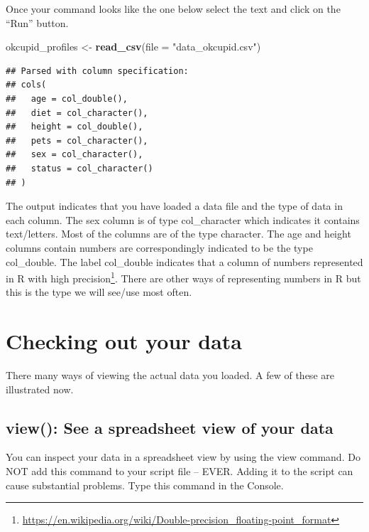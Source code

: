 \documentclass[
]{krantz}
\makeatletter
\newenvironment{Shaded}{\begin{snugshade}}{\end{snugshade}}
\newcommand{\DataTypeTok}[1]{\textcolor[rgb]{0.27,0.27,0.27}{#1}}
\newcommand{\KeywordTok}[1]{\textcolor[rgb]{0.27,0.27,0.27}{\textbf{#1}}}
\newcommand{\NormalTok}[1]{#1}
\newcommand{\StringTok}[1]{\textcolor[rgb]{0.5,0.5,0.5}{#1}}
\renewcommand{\href}[2]{#2\footnote{\url{#1}}}
\newenvironment{kframe}{%
\medskip{}
\setlength{\fboxsep}{.8em}
 \def\at@end@of@kframe{}%
 \ifinner\ifhmode%
  \def\at@end@of@kframe{\end{minipage}}%
  \begin{minipage}{\columnwidth}%
 \fi\fi%
 \def\FrameCommand##1{\hskip\@totalleftmargin \hskip-\fboxsep
 \colorbox{shadecolor}{##1}\hskip-\fboxsep
     \hskip-\linewidth \hskip-\@totalleftmargin \hskip\columnwidth}%
 \MakeFramed {\advance\hsize-\width
   \@totalleftmargin\z@ \linewidth\hsize
   \@setminipage}}%
 {\par\unskip\endMakeFramed%
 \at@end@of@kframe}
\renewenvironment{Shaded}{\begin{kframe}}{\end{kframe}}
\makeatother
\begin{document}
Once your command looks like the one below select the text and click on the ``Run'' button.

\begin{Shaded}
\begin{Highlighting}[]
\NormalTok{okcupid_profiles <-}\StringTok{ }\KeywordTok{read_csv}\NormalTok{(}\DataTypeTok{file =} \StringTok{"data_okcupid.csv"}\NormalTok{)}
\end{Highlighting}
\end{Shaded}

\begin{verbatim}
## Parsed with column specification:
## cols(
##   age = col_double(),
##   diet = col_character(),
##   height = col_double(),
##   pets = col_character(),
##   sex = col_character(),
##   status = col_character()
## )
\end{verbatim}

The output indicates that you have loaded a data file and the type of data in each column. The sex column is of type col\_character which indicates it contains text/letters. Most of the columns are of the type character. The age and height columns contain numbers are correspondingly indicated to be the type col\_double. The label col\_double indicates that a column of numbers represented in R with \href{https://en.wikipedia.org/wiki/Double-precision_floating-point_format}{high precision}. There are other ways of representing numbers in R but this is the type we will see/use most often.

\hypertarget{checking-out-your-data}{%
\section{Checking out your data}\label{checking-out-your-data}}

There many ways of viewing the actual data you loaded. A few of these are illustrated now.

\hypertarget{view-see-a-spreadsheet-view-of-your-data}{%
\subsection{view(): See a spreadsheet view of your data}\label{view-see-a-spreadsheet-view-of-your-data}}

You can inspect your data in a spreadsheet view by using the view command. Do NOT add this command to your script file -- EVER. Adding it to the script can cause substantial problems. Type this command in the Console.
\end{document}
